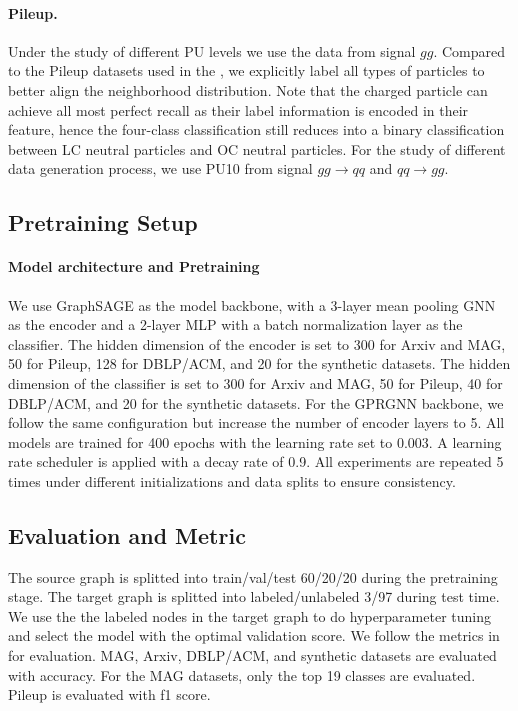 \paragraph{Pileup.} Under the study of different PU levels we use the data from signal $gg$. Compared to the Pileup datasets used in the \cite{liu2024pairwise}, we explicitly label all types of particles to better align the neighborhood distribution. Note that the charged particle can achieve all most perfect recall as their label information is encoded in their feature, hence the four-class classification still reduces into a binary classification between LC neutral particles and OC neutral particles.
For the study of different data generation process, we use PU10 from signal $gg\rightarrow qq$ and $qq \rightarrow gg$.

\subsection{Pretraining Setup}
\paragraph{Model architecture and Pretraining} 
We use GraphSAGE as the model backbone, with a 3-layer mean pooling GNN as the encoder and a 2-layer MLP with a batch normalization layer as the classifier.
The hidden dimension of the encoder is set to 300 for Arxiv and MAG, 50 for Pileup, 128 for DBLP/ACM, and 20 for the synthetic datasets.
The hidden dimension of the classifier is set to 300 for Arxiv and MAG, 50 for Pileup, 40 for DBLP/ACM, and 20 for the synthetic datasets.
For the GPRGNN backbone, we follow the same configuration but increase the number of encoder layers to 5.
All models are trained for 400 epochs with the learning rate set to 0.003. A learning rate scheduler is applied with a decay rate of 0.9.
All experiments are repeated 5 times under different initializations and data splits to ensure consistency.


\subsection{Evaluation and Metric}
The source graph is splitted into train/val/test 60/20/20 during the pretraining stage. The target graph is splitted into labeled/unlabeled 3/97 during test time. 
We use the the labeled nodes in the target graph to do hyperparameter tuning and select the model with the optimal validation score.
We follow the metrics in~\cite{liu2024pairwise} for evaluation. MAG, Arxiv, DBLP/ACM, and synthetic datasets are evaluated with accuracy.
For the MAG datasets, only the top 19 classes are evaluated.
Pileup is evaluated with f1 score.

